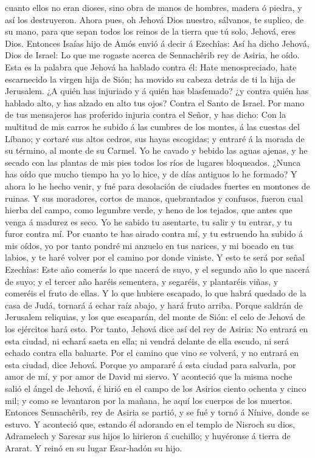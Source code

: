 cuanto ellos no eran dioses, sino obra de manos de hombres, madera ó
piedra, y así los destruyeron.  Ahora pues, oh Jehová Dios
nuestro, sálvanos, te suplico, de su mano, para que sepan todos los
reinos de la tierra que tú solo, Jehová, eres Dios. 
Entonces Isaías hijo de Amós envió á decir á Ezechîas: Así ha dicho
Jehová, Dios de Israel: Lo que me rogaste acerca de Sennachêrib rey de
Asiria, he oído.  Esta es la palabra que Jehová ha hablado
contra él: Hate menospreciado, hate escarnecido la virgen hija de Sión;
ha movido su cabeza detrás de ti la hija de Jerusalem.  ¿A
quién has injuriado y á quién has blasfemado? ¿y contra quién has
hablado alto, y has alzado en alto tus ojos? Contra el Santo de Israel.
 Por mano de tus mensajeros has proferido injuria contra el
Señor, y has dicho: Con la multitud de mis carros he subido á las
cumbres de los montes, á las cuestas del Líbano; y cortaré sus altos
cedros, sus hayas escogidas; y entraré á la morada de su término, al
monte de su Carmel.  Yo he cavado y bebido las aguas
ajenas, y he secado con las plantas de mis pies todos los ríos de
lugares bloqueados.  ¿Nunca has oído que mucho tiempo ha yo
lo hice, y de días antiguos lo he formado? Y ahora lo he hecho venir, y
fué para desolación de ciudades fuertes en montones de ruinas.
 Y sus moradores, cortos de manos, quebrantados y confusos,
fueron cual hierba del campo, como legumbre verde, y heno de los
tejados, que antes que venga á madurez es seco.  Yo he
sabido tu asentarte, tu salir y tu entrar, y tu furor contra mí.
 Por cuanto te has airado contra mí, y tu estruendo ha
subido á mis oídos, yo por tanto pondré mi anzuelo en tus narices, y mi
bocado en tus labios, y te haré volver por el camino por donde viniste.
 Y esto te será por señal Ezechîas: Este año comerás lo que
nacerá de suyo, y el segundo año lo que nacerá de suyo; y el tercer año
haréis sementera, y segaréis, y plantaréis viñas, y comeréis el fruto de
ellas.  Y lo que hubiere escapado, lo que habrá quedado de
la casa de Judá, tornará á echar raíz abajo, y hará fruto arriba.
 Porque saldrán de Jerusalem reliquias, y los que
escaparán, del monte de Sión: el celo de Jehová de los ejércitos hará
esto.  Por tanto, Jehová dice así del rey de Asiria: No
entrará en esta ciudad, ni echará saeta en ella; ni vendrá delante de
ella escudo, ni será echado contra ella baluarte.  Por el
camino que vino se volverá, y no entrará en esta ciudad, dice Jehová.
 Porque yo ampararé á esta ciudad para salvarla, por amor
de mí, y por amor de David mi siervo.  Y aconteció que la
misma noche salió el ángel de Jehová, é hirió en el campo de los Asirios
ciento ochenta y cinco mil; y como se levantaron por la mañana, he aquí
los cuerpos de los muertos.  Entonces Sennachêrib, rey de
Asiria se partió, y se fué y tornó á Nínive, donde se estuvo.
 Y aconteció que, estando él adorando en el templo de
Nisroch su dios, Adramelech y Saresar sus hijos lo hirieron á cuchillo;
y huyéronse á tierra de Ararat. Y reinó en su lugar Esar-hadón su hijo.

